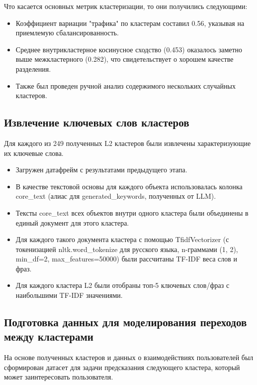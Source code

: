 Что касается основных метрик кластеризации, то они получились следующими:
\begin{itemize}
    \item Коэффициент вариации "трафика" по кластерам составил 0.56, указывая на приемлемую сбалансированность.
    \item Среднее внутрикластерное косинусное сходство (0.453) оказалось заметно выше межкластерного (0.282), что свидетельствует о хорошем качестве разделения.
    \item Также был проведен ручной анализ содержимого нескольких случайных кластеров.
\end{itemize}

\subsection*{Извлечение ключевых слов кластеров}
Для каждого из 249 полученных L2 кластеров были извлечены характеризующие их ключевые слова.

\begin{itemize}
    \item Загружен датафрейм с результатами предыдущего этапа.
    \item В качестве текстовой основы для каждого объекта использовалась колонка core\_text (алиас для generated\_keywords, полученных от LLM).
    \item Тексты core\_text всех объектов внутри одного кластера были объединены в единый документ для этого кластера.
    \item Для каждого такого документа кластера с помощью TfidfVectorizer (с токенизацией nltk.word\_tokenize для русского языка, n-граммами (1, 2), min\_df=2, max\_features=50000) были рассчитаны TF-IDF веса слов и фраз.
    \item Для каждого кластера L2 были отобраны топ-5 ключевых слов/фраз с наибольшими TF-IDF значениями.
\end{itemize}

\subsection*{Подготовка данных для моделирования переходов между кластерами}

На основе полученных кластеров и данных о взаимодействиях пользователей был сформирован датасет для задачи предсказания следующего кластера, который может заинтересовать пользователя.

